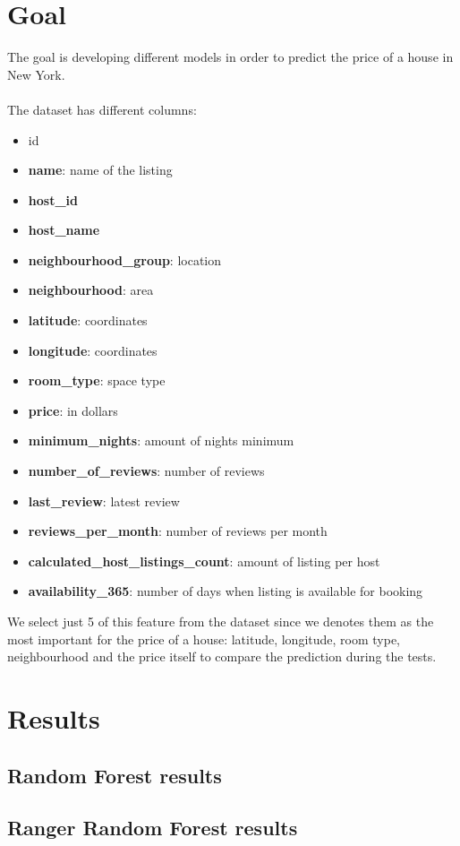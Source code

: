 \documentclass{FR16}
\begin{document}
\section{Goal}
The goal is developing different models in order to predict the price of a house in New York.
\\\\
The dataset has different columns: 
\begin{itemize}
\item id
\item \textbf{name}: name of the listing
\item \textbf{host\_id}
\item \textbf{host\_name}
\item \textbf{neighbourhood\_group}: location
\item \textbf{neighbourhood}: area
\item \textbf{latitude}: coordinates
\item \textbf{longitude}: coordinates
\item \textbf{room\_type}: space type
\item \textbf{price}:  in dollars
\item \textbf{minimum\_nights}: amount of nights minimum
\item \textbf{number\_of\_reviews}: number of reviews
\item \textbf{last\_review}: latest review
\item \textbf{reviews\_per\_month}: number of reviews per month
\item \textbf{calculated\_host\_listings\_count}: amount of listing per host
\item  \textbf{availability\_365}: number of days when listing is available for booking\\
\end{itemize}
We select just 5 of this feature from the dataset since we denotes them as the most important for the price of a house: latitude, longitude, room type, neighbourhood and the price itself to compare the prediction during the tests. \\
\newpage
\section{Results}

\subsection{Random Forest results}
\subsection{Ranger Random Forest results}
\end{document}
